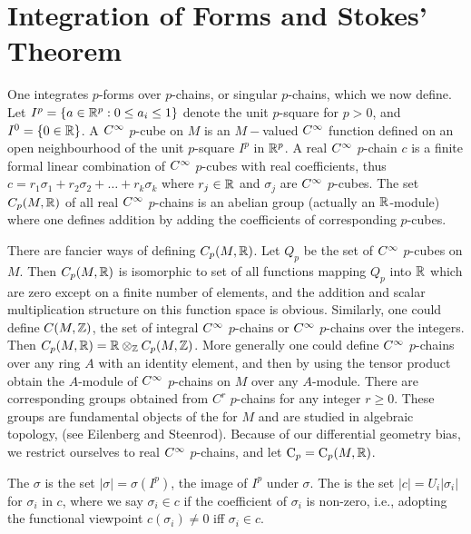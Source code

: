 \documentclass[../main]{subfiles}
\begin{document}
\section{Integration of Forms and Stokes' Theorem}\label{ch07:s5}
One integrates $p$-forms over $p$-chains, or singular $p$-chains, which we now define. Let $I^{p}=\{a \in \mathbb{R}^p : 0 \le a_i \le 1\}$ denote the unit $p$-square for $p>0$, and $I^0=\{0 \in \mathbb{R}\}$. A $C^\infty$ $p$-cube on $M$ is an $M-$valued $C^\infty$ function defined on an open neighbourhood of the unit $p$-square $I^p$ in $\mathbb{R}^p$. A real $C^\infty$ $p$-chain $c$ is a finite formal linear combination of $C^\infty$ $p$-cubes with real coefficients, thus $c=r_{1} \sigma_{1}+r_{2} \sigma_{2}+\ldots+r_{k} \sigma_{k}$ where $r_{j} \in \mathbb{R}$ and $\sigma_{j}$ are $C^\infty$ $p$-cubes. The set $C_{p}(M, \mathbb{R})$ of all real $C^\infty$ $p$-chains is an abelian group (actually an $\mathbb{R}$-module) where one defines addition by adding the coefficients of corresponding $p$-cubes.

There are fancier ways of defining $C_{p}(M, \mathbb{R})$. Let $Q_{p}$ be the set of $C^\infty$ $p$-cubes on $M$. Then $C_{p}(M, \mathbb{R})$ is isomorphic to set of all functions mapping $Q_{p}$ into $\mathbb{R}$ which are zero except on a finite number of elements, and the addition and scalar multiplication structure on this function space is obvious. Similarly, one could define $C(M, \mathbb{Z})$, the set of integral $C^\infty$ $p$-chains or $C^\infty$ $p$-chains over the integers. Then $C_{p}(M, \mathbb{R})=\mathbb{R} \otimes_{\mathbb{Z}} C_{p}(M, \mathbb{Z})$. More generally one could define $C^\infty$ $p$-chains over any ring $A$ with an identity element, and then by using the tensor product obtain the $A$-module of $C^\infty$ $p$-chains on $M$ over any $A$-module. There are corresponding groups obtained from $C^r$ $p$-chains for any integer $r \geq 0$. These groups are fundamental objects of the  for $M$ and are studied in algebraic topology, (see Eilenberg and Steenrod). Because of our differential geometry bias, we restrict ourselves to real $C^\infty$ $p$-chains, and let $\mathrm{C}_{p}=\mathrm{C}_{p}(M, \mathbb{R})$.

The  $\sigma$ is the set $|\sigma|=\sigma\left(I^{p}\right)$, the image of $I^{p}$ under $\sigma$. The  is the set $|c| = U_i |\sigma_i|$ for $\sigma_i$ in $c$, where we say $\sigma_i \in c$ if the coefficient of $\sigma_i$ is non-zero, i.e., adopting the functional viewpoint $c(\sigma_i) \ne 0$ iff $\sigma_i \in c$.
\end{document}
